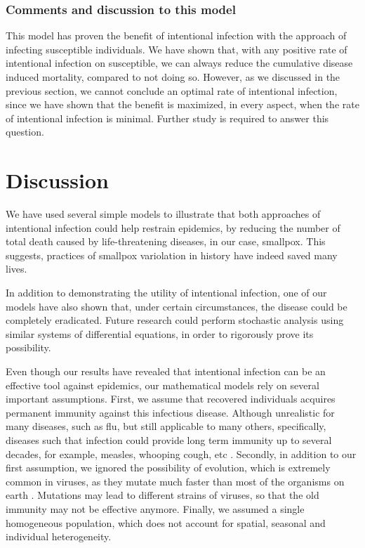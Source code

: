 \documentclass[12pt]{article}
\begin{document}
\subsubsection{Comments and discussion to this model}
This model has proven the benefit of intentional infection with the approach of infecting susceptible individuals. We have shown that, with any positive rate of intentional infection on susceptible, we can always reduce the cumulative disease induced mortality, compared to not doing so. However, as we discussed in the previous section, we cannot conclude an optimal rate of intentional infection, since we have shown that the benefit is maximized, in every aspect, when the rate of intentional infection is minimal. Further study is required to answer this question.
\section{Discussion}
We have used several simple models to illustrate that both approaches of intentional infection could help restrain epidemics, by reducing the number of total death caused by life-threatening diseases, in our case, smallpox. This suggests, practices of smallpox variolation in history have indeed saved many lives. 

In addition to demonstrating the utility of intentional infection, one of our models have also shown that, under certain circumstances, the disease could be completely eradicated. Future research could perform stochastic analysis using similar systems of differential equations, in order to rigorously prove its possibility.

Even though our results have revealed that intentional infection can be an effective tool against epidemics, our mathematical models rely on several important assumptions. First, we assume that recovered individuals acquires permanent immunity against this infectious disease. Although unrealistic for many diseases, such as flu, but still applicable to many others, specifically, diseases such that infection could provide long term immunity up to several decades, for example, measles, whooping cough, etc \cite{amanna2007duration}. Secondly, in addition to our first assumption, we ignored the possibility of evolution, which is extremely common in viruses, as they mutate much faster than most of the organisms on earth \cite{purcell2000hepatitis}. Mutations may lead to different strains of viruses, so that the old immunity may not be effective anymore. Finally, we assumed a single homogeneous population, which does not account for spatial, seasonal and individual heterogeneity.
\end{document}
